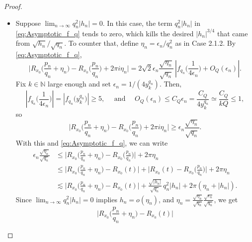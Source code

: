 \documentclass[10pt,a4paper]{amsart}
\begin{document}
\begin{proof}
\begin{itemize}
\begin{itemize}
	
	\item[\textbf{Case 2.2.}] Suppose $\lim_{n \to \infty} q_n^2 |h_n| = 0$. 
	In this case, the term $q_n^2 |h_n|$ in \eqref{eq:Asymptotic_f_q} tends to zero, which kills the desired $|h_n|^{3/4}$ that came from $\sqrt{h_n}/\sqrt{q_n}$. 
	To counter that, define $\eta_n = \epsilon_n / q_n^2$ 
	as in Case 2.1.2. By \eqref{eq:Asymptotic_f_q}, 
	\begin{equation}
	\Big|  R_{x_0}\Big( \frac{p_n}{q_n} + \eta_n \Big) - R_{x_0}\Big( \frac{p_n}{q_n} \Big) + 2\pi i \eta_n  \Big|
	= 2\sqrt{2} \epsilon_n \frac{\sqrt{\eta_n}}{\sqrt{q_n}} \,
\left|  f_{q_n}\Big( \frac{1}{4\epsilon_n}  \Big)  + O_Q\left(\epsilon_n  \right)
\right|.
	\end{equation}
	Fix $k \in \mathbb N$ large enough and set $\epsilon_n = 1/(4y_k^{q_n})$. Then,
	\begin{equation}
	\left|  f_{q_n}\Big( \frac{1}{4\epsilon_n}  \Big)  \right| 
	= \left|  f_{q_n}\Big( y_k^{q_n} \Big)  \right| \geq 5, 
	\quad \text{ and } \quad
	O_Q(\epsilon_n) \leq C_Q \epsilon_n = \frac{C_Q}{4y_k^{q_n}} \simeq \frac{C_Q}{kQ} \leq 1,
	\end{equation}
	so
	\begin{equation}
	\Big|  R_{x_0}\Big( \frac{p_n}{q_n} + \eta_n \Big) - R_{x_0}\Big( \frac{p_n}{q_n} \Big) + 2\pi i \eta_n  \Big|
	\geq  \epsilon_n \frac{\sqrt{\eta_n}}{\sqrt{q_n}}. 
	\end{equation}
	With this and \eqref{eq:Asymptotic_f_q}, we can write
	\begin{equation}
	\begin{split}
	\epsilon_n \frac{\sqrt{\eta_n}}{\sqrt{q_n}} 
	&  \leq \Big|  R_{x_0}\Big( \frac{p_n}{q_n} + \eta_n \Big) - R_{x_0}\Big( \frac{p_n}{q_n} \Big) \Big| + 2\pi \eta_n  \\
	 &  \leq \Big|  R_{x_0}\Big( \frac{p_n}{q_n} + \eta_n \Big) -R_{x_0}(t) \Big| + \Big| R_{x_0}(t) -  R_{x_0}\Big( \frac{p_n}{q_n} \Big) \Big| + 2\pi \eta_n  \\ 
	 &  \lesssim \Big|  R_{x_0}\Big( \frac{p_n}{q_n} + \eta_n \Big) -R_{x_0}(t) \Big| + \frac{\sqrt{|h_n|}}{\sqrt{q_n}} \, q_n^2 |h_n| + 2\pi (\eta_n + |h_n|).
	 \end{split}
	\end{equation}
	Since $\lim_{n \to \infty} q_n^2 |h_n|=0$ implies $h_n = o(\eta_n)$, and $\eta_n =  \frac{\sqrt{\eta_n}}{\sqrt{q_n}} \frac{\sqrt{\epsilon_n}}{\sqrt{q_n}}$, 
	we get
	\begin{equation}
	\Big|  R_{x_0}\Big( \frac{p_n}{q_n} + \eta_n \Big) -R_{x_0}(t) \Big|

\end{equation}
\end{itemize}
\end{itemize}
\end{proof}
\end{document}
